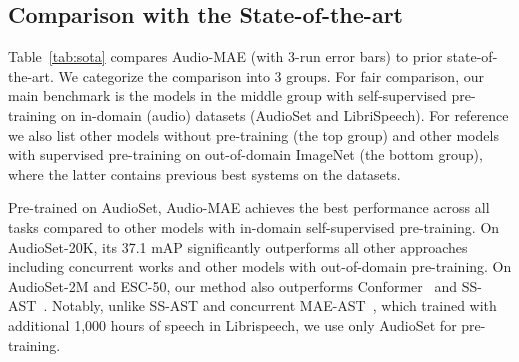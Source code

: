 \documentclass{article}
\begin{document}
\subsection{Comparison with the State-of-the-art }



Table~\ref{tab:sota} compares Audio-MAE (with 3-run error bars) to prior state-of-the-art. We categorize the comparison into 3 groups. 
For fair comparison, our main benchmark is the models in the middle group with self-supervised pre-training on in-domain (audio) datasets (AudioSet and LibriSpeech). 
For reference we also list other models without pre-training (the top group) and other models with supervised pre-training on out-of-domain ImageNet (the bottom group), where the latter contains previous best systems on the datasets.


Pre-trained on AudioSet, Audio-MAE achieves the best performance across all tasks compared to other models with in-domain self-supervised pre-training. 
On AudioSet-20K, its 37.1 mAP significantly outperforms all other approaches including concurrent works and other models with out-of-domain pre-training.
On AudioSet-2M and ESC-50, our method also outperforms Conformer~\cite{srivastava2021conformer} and SS-AST~\cite{ssast}. 
Notably, unlike SS-AST and concurrent MAE-AST~\cite{baade2022}, which trained with additional 1,000 hours of speech in Librispeech, we use only AudioSet for pre-training.
\end{document}
